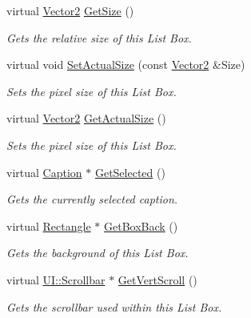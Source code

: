 \begin{DoxyCompactItemize}
virtual \hyperlink{classphys_1_1Vector2}{Vector2} \hyperlink{classphys_1_1UI_1_1ListBox_a7af2cced185d63be6a62d5122c700d81}{GetSize} ()
\begin{DoxyCompactList}\small\item\em Gets the relative size of this List Box. \item\end{DoxyCompactList}\item 
virtual void \hyperlink{classphys_1_1UI_1_1ListBox_a742810da75f2b3889794498f05af8860}{SetActualSize} (const \hyperlink{classphys_1_1Vector2}{Vector2} \&Size)
\begin{DoxyCompactList}\small\item\em Sets the pixel size of this List Box. \item\end{DoxyCompactList}\item 
virtual \hyperlink{classphys_1_1Vector2}{Vector2} \hyperlink{classphys_1_1UI_1_1ListBox_a23133ed4a98994d838acee4c6a981e04}{GetActualSize} ()
\begin{DoxyCompactList}\small\item\em Sets the pixel size of this List Box. \item\end{DoxyCompactList}\item 
virtual \hyperlink{classphys_1_1UI_1_1Caption}{Caption} $\ast$ \hyperlink{classphys_1_1UI_1_1ListBox_a729f4ef3e0bc10bf8e96f20a83767484}{GetSelected} ()
\begin{DoxyCompactList}\small\item\em Gets the currently selected caption. \item\end{DoxyCompactList}\item 
virtual \hyperlink{classphys_1_1UI_1_1Rectangle}{Rectangle} $\ast$ \hyperlink{classphys_1_1UI_1_1ListBox_a087fba492ebd70a58d2772fccbfec466}{GetBoxBack} ()
\begin{DoxyCompactList}\small\item\em Gets the background of this List Box. \item\end{DoxyCompactList}\item 
virtual \hyperlink{classphys_1_1UI_1_1Scrollbar}{UI::Scrollbar} $\ast$ \hyperlink{classphys_1_1UI_1_1ListBox_a9f62475c3a81772407af38076363060e}{GetVertScroll} ()
\begin{DoxyCompactList}\small\item\em Gets the scrollbar used within this List Box. \item\end{DoxyCompactList}\end{DoxyCompactItemize}
